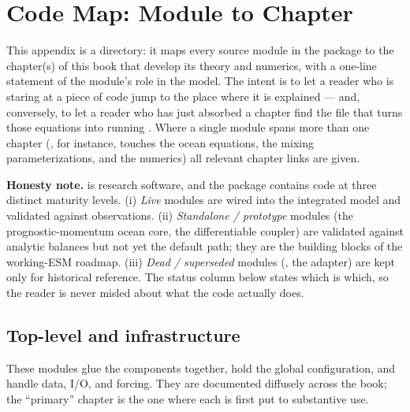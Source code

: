 \chapter{Code Map: Module to Chapter}\label{chap:appC_codemap}

This appendix is a directory: it maps every source module in the 
package to the chapter(s) of this book that develop its theory and numerics, with a
one-line statement of the module's role in the model. The intent is to let a reader who
is staring at a piece of code jump to the place where it is explained --- and,
conversely, to let a reader who has just absorbed a chapter find the file that turns
those equations into running \jax. Where a single module spans more than one chapter
(, for instance, touches the ocean equations, the mixing
parameterizations, and the numerics) all relevant chapter links are given.

\bigskip
\noindent\textbf{Honesty note.}\quad \model{} is research software, and the package
contains code at three distinct maturity levels. (i) \emph{Live} modules are wired into
the integrated model and validated against observations. (ii) \emph{Standalone /
prototype} modules (the prognostic-momentum ocean core, the differentiable \dino{}
coupler) are validated against analytic balances but not yet the default path; they are
the building blocks of the working-ESM roadmap. (iii) \emph{Dead / superseded} modules
(, the  adapter) are kept only for historical reference.
The status column below states which is which, so the reader is never misled about what
the code actually does.

\section{Top-level and infrastructure}

These modules glue the components together, hold the global configuration, and handle
data, I/O, and forcing. They are documented diffusely across the book; the
``primary'' chapter is the one where each is first put to substantive use.


